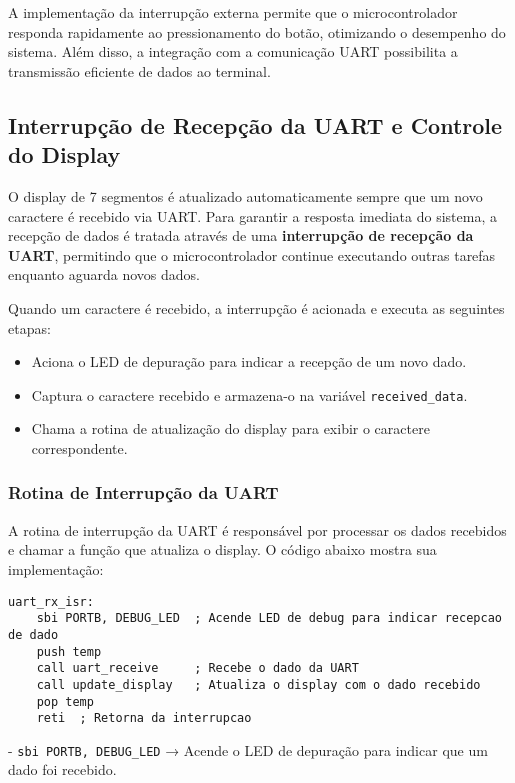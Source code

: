 \documentclass{sbrt}
\begin{document}
A implementação da interrupção externa permite que o microcontrolador responda rapidamente ao pressionamento do botão, otimizando o desempenho do sistema. Além disso, a integração com a comunicação UART possibilita a transmissão eficiente de dados ao terminal.

\subsection{Interrupção de Recepção da UART e Controle do Display}

O display de 7 segmentos é atualizado automaticamente sempre que um novo caractere é recebido via UART. Para garantir a resposta imediata do sistema, a recepção de dados é tratada através de uma \textbf{interrupção de recepção da UART}, permitindo que o microcontrolador continue executando outras tarefas enquanto aguarda novos dados.

Quando um caractere é recebido, a interrupção é acionada e executa as seguintes etapas:
\begin{itemize}
    \item Aciona o LED de depuração para indicar a recepção de um novo dado.
    \item Captura o caractere recebido e armazena-o na variável \texttt{received\_data}.
    \item Chama a rotina de atualização do display para exibir o caractere correspondente.
\end{itemize}

\subsubsection{Rotina de Interrupção da UART}

A rotina de interrupção da UART é responsável por processar os dados recebidos e chamar a função que atualiza o display. O código abaixo mostra sua implementação:

\begin{lstlisting}[style=assemblyStyle, caption={Rotina de Interrupcao da UART}, label={lst:uart_rx_isr}]
uart_rx_isr:
    sbi PORTB, DEBUG_LED  ; Acende LED de debug para indicar recepcao de dado
    push temp
    call uart_receive     ; Recebe o dado da UART
    call update_display   ; Atualiza o display com o dado recebido
    pop temp
    reti  ; Retorna da interrupcao
\end{lstlisting}

- \texttt{sbi PORTB, DEBUG\_LED} → Acende o LED de depuração para indicar que um dado foi recebido.
\end{document}
